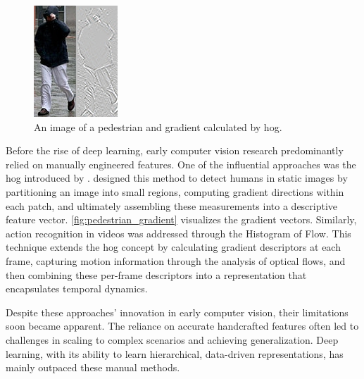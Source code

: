 \begin{figure}
    \centering
    \includegraphics[width=0.5\linewidth]{figures/Pedestrian_gradient.jpg}
    \caption{An image of a pedestrian and gradient calculated by \acrshort{hog}.}
    \label{fig:pedestrian_gradient}
\end{figure}

Before the rise of deep learning, early computer vision research predominantly relied on manually engineered features. One of the influential approaches was the \acrfull{hog} introduced by \textcite{dalal_histogram_of_gradients}. \textcite{dalal_histogram_of_gradients} designed this method to detect humans in static images by partitioning an image into small regions, computing gradient directions within each patch, and ultimately assembling these measurements into a descriptive feature vector. \autoref{fig:pedestrian_gradient} visualizes the gradient vectors. Similarly, action recognition in videos was addressed through the Histogram of Flow\cite{dalal_histogram_of_flow}. This technique extends the \acrshort{hog} concept by calculating gradient descriptors at each frame, capturing motion information through the analysis of optical flows, and then combining these per-frame descriptors into a representation that encapsulates temporal dynamics. 

Despite these approaches' innovation in early computer vision, their limitations soon became apparent. The reliance on accurate handcrafted features often led to challenges in scaling to complex scenarios and achieving generalization. Deep learning, with its ability to learn hierarchical, data-driven representations, has mainly outpaced these manual methods.

